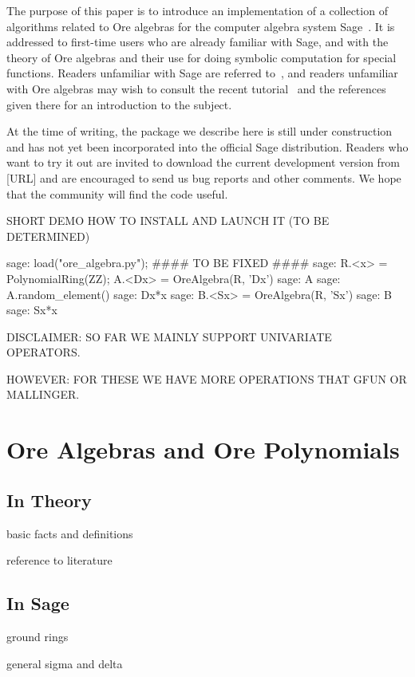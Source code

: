 \documentclass{amsart}
\begin{document}
The purpose of this paper is to introduce an implementation of a collection of
algorithms related to Ore algebras for the computer algebra system
Sage~\cite{..}. It is addressed to first-time users who are already familiar
with Sage, and with the theory of Ore algebras and their use for doing symbolic
computation for special functions. Readers unfamiliar with Sage are referred
to~\cite{..}, and readers unfamiliar with Ore algebras may wish to consult the
recent tutorial~\cite{..} and the references given there for an introduction to
the subject.

At the time of writing, the package we describe here is still under construction
and has not yet been incorporated into the official Sage distribution. Readers
who want to try it out are invited to download the current development version
from [URL] and are encouraged to send us bug reports and other comments. We hope
that the community will find the code useful.

SHORT DEMO HOW TO INSTALL AND LAUNCH IT (TO BE DETERMINED)

\begin{sageexample}
  sage: load("ore_algebra.py");  #### TO BE FIXED ####
  sage: R.<x> = PolynomialRing(ZZ); A.<Dx> = OreAlgebra(R, 'Dx')
  sage: A
  sage: A.random_element()
  sage: Dx*x
  sage: B.<Sx> = OreAlgebra(R, 'Sx')
  sage: B
  sage: Sx*x
\end{sageexample}

DISCLAIMER: SO FAR WE MAINLY SUPPORT UNIVARIATE OPERATORS.

HOWEVER: FOR THESE WE HAVE MORE OPERATIONS THAT GFUN OR MALLINGER. 

\section{Ore Algebras and Ore Polynomials}

\subsection{In Theory}

basic facts and definitions

reference to literature

\subsection{In Sage}

ground rings 

general sigma and delta
\end{document}

